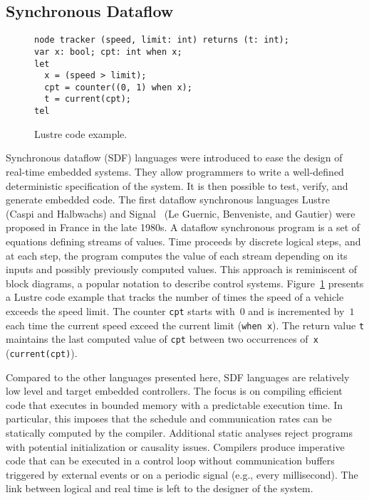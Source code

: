 \subsection{Synchronous Dataflow}\label{sec:sdf} %

\begin{figure}[!h]
\begin{lstlisting}[morekeywords={node,int,bool,returns,var,when,let,tel,current}]
node tracker (speed, limit: int) returns (t: int);
var x: bool; cpt: int when x;
let
  x = (speed > limit);
  cpt = counter((0, 1) when x);
  t = current(cpt);
tel
\end{lstlisting}
\vspace*{-4mm}
\caption{\label{fig:lustre} Lustre code example.}
\end{figure}

Synchronous dataflow (SDF) languages were introduced to ease the design of
real-time embedded systems. They allow programmers to write a well-defined
deterministic specification of the system. It is then possible to
test, verify, and generate embedded code.
The first data\-flow synchronous languages \textsf{Lustre}~\cite{lustre_1987}
(Caspi and Halbwachs) and \textsf{Signal}~\cite{signal_1991} (Le Guernic,
Benveniste, and Gautier) were proposed in France in the late 1980s.
A dataflow synchronous program is a set of equations defining streams
of values. Time proceeds by discrete logical steps, and at each step,
the program computes the value of each stream depending on its inputs
and possibly previously computed values.
This approach is reminiscent of block diagrams, a popular notation to
describe control systems.
Figure~\ref{fig:lustre} presents a Lustre code example that tracks the
number of times the speed of a vehicle exceeds the speed limit. The
counter \lstinline{cpt} starts with~$0$ and is incremented by~$1$ each
time the current speed exceed the current limit (\lstinline{when x}).
The return value \lstinline{t} maintains the last computed value
of \lstinline{cpt} between two occurrences of~\lstinline{x}
(\lstinline{current(cpt)}).

Compared to the other languages presented here, SDF languages are
relatively low level and target embedded controllers. The focus is on
compiling efficient code that executes in bounded memory with a
predictable execution time.  In particular, this imposes that the
schedule and communication rates can be statically computed by the
compiler. Additional static analyses reject programs with potential
initialization or causality issues. Compilers produce imperative code
that can be executed in a control loop without communication buffers
triggered by external events or on a periodic signal (e.g., every
millisecond). The link between logical and real time is left to the
designer of the system.

